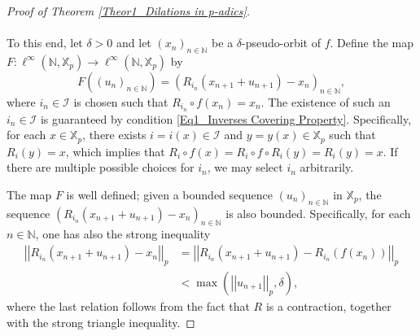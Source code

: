 \documentclass[a4paper, 12pt]{article}
\theoremstyle{definition}
\begin{document}
\begin{proof}[Proof of Theorem \ref{Theor1_Dilations in p-adics}]
		\paragraph{} To this end, let $\delta  >0$ and let $ \left(  x_{n}   \right)_{n \in \mathbb{N} }$ be a $\delta$-pseudo-orbit of $f$. Define the map $F : \ell^{ \infty } \left(   \mathbb{N} ,   \mathbb{X}_{p}  \right) \rightarrow \ell^{ \infty } \left(   \mathbb{N} ,   \mathbb{X}_{p}  \right) $ by
		\begin{equation}\label{Eq1_Fixed Point Operator}
			F \left(   \left(  u_{n}   \right)_{n \in \mathbb{N} }  \right)    =    \left(  R_{i_{n}}(x_{n+1} + u_{n+1}) - x_n    \right)_{n \in \mathbb{N} } , 
		\end{equation}
		where $i_{n}  \in \mathcal{I}$ is chosen such that $R_{i_{n}} \circ f  \left(  x_{n}  \right)  = x_{n}$. The existence of such an $i_{n} \in \mathcal{I}$ is guaranteed by condition \eqref{Eq1_Inverses Covering Property}. Specifically, for each $x \in \mathbb{X}_{p}$, there exists $i = i(x) \in \mathcal{I}$ and $y = y(x) \in \mathbb{X}_{p}$ such that $R_{i}(y) = x$, which implies that $R_{i} \circ f(x) = R_{i} \circ f \circ R_{i}(y) = R_{i}(y) = x $. 
		If there are multiple possible choices for $i_{n}$, we may select $i_{n}$ arbitrarily. 
		
		The map $F$ is well defined; given a bounded sequence $ \left(  u_{n}   \right)_{n \in \mathbb{N} }$ in $\mathbb{X}_{p}$, the sequence $ \left(   R_{i_{n}} \left(  x_{n+1} + u_{n+1}  \right)  - x_{n}   \right)_{n \in \mathbb{N} }$ is also bounded. Specifically, for each $n\in \mathbb{N} $, one has also the strong inequality 	
		\begin{align*}
			\left| \left|  R_{i_{n}} \left(  x_{n+1} + u_{n+1}  \right)  - x_{n}  \right|  \right|_{p}   &=     \left| \left|  R_{i_{n}} \left(  x_{n+1} + u_{n+1}  \right)  - R_{i_{n}} \left(  f \left(  x_{n}  \right)   \right)   \right|  \right|_{p}   \\   		
			& <    \max \left(   \left| \left|  u_{n+1}  \right|  \right|_{p} , \delta   \right) ,
		\end{align*}
		where the last relation follows from the fact that $R$ is a contraction, together with the strong triangle inequality. 
		

\end{proof}
\end{document}
